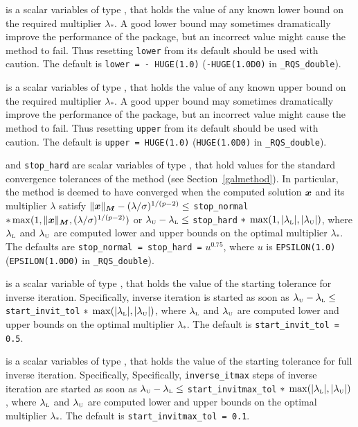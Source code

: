 \documentclass{galahad}
\newcommand{\packagename}{RQS}
\newcommand{\fullpackagename}{\libraryname\_\packagename}
\begin{document}
\begin{description}
 is a scalar variables of type \realdp, that holds the value
of any known lower bound on the required multiplier $\lambda_*$. A good lower
bound may sometimes dramatically improve the performance of the package, but
an incorrect value might cause the method to fail. Thus resetting
{\tt lower} from its default should be used with caution.
The default is {\tt lower = - HUGE(1.0)}
({\tt -HUGE(1.0D0)} in {\tt \fullpackagename\_double}).

 is a scalar variables of type \realdp, that holds the value
of any known upper bound on the required multiplier $\lambda_*$. A good upper
bound may sometimes dramatically improve the performance of the package, but
an incorrect value might cause the method to fail. Thus resetting
{\tt upper} from its default should be used with caution.
The default is {\tt upper = HUGE(1.0)}
({\tt HUGE(1.0D0)} in {\tt \fullpackagename\_double}).

 and {\tt stop\_hard} are scalar variables of type \realdp,
that hold values for the standard convergence tolerances of the method
(see Section~\ref{galmethod}).
In particular, the method is deemed to have converged when the
computed solution ${\bm{x}}$ and its multiplier $\lambda$ satisfy
$\|{\bm{x}}\|_{{\bm{M}}} -  (\lambda/\sigma)^{1/(p-2)} \leq$ {\tt stop\_normal}
$\ast \max(1,\|{\bm{x}}\|_{{\bm{M}}},(\lambda/\sigma)^{1/(p-2)})$ or
$\lambda_{\mbox{\protect\tiny U}} - \lambda_{\mbox{\protect\tiny L}}
\leq$ {\tt stop\_hard} $\ast \; \max( 1, | \lambda_{\mbox{\protect\tiny L}} |,
| \lambda_{\mbox{\protect\tiny U}} | )$, where
$\lambda_{\mbox{\protect\tiny L}}$ and
$\lambda_{\mbox{\protect\tiny U}}$ are computed lower and upper bounds
on the optimal multiplier $\lambda_*$.
The defaults are {\tt stop\_normal = stop\_hard =} $u^{0.75}$,
where $u$ is {\tt EPSILON(1.0)} ({\tt EPSILON(1.0D0)} in
{\tt \fullpackagename\_double}).

 is a scalar variable of type \realdp, that holds the
value of the starting tolerance for inverse iteration.
Specifically, inverse iteration is started as soon as
$\lambda_{\mbox{\protect\tiny U}} - \lambda_{\mbox{\protect\tiny L}}
\leq$ {\tt start\_invit\_tol} $\ast \;
 \max( | \lambda_{\mbox{\protect\tiny L}} |,
 | \lambda_{\mbox{\protect\tiny U}} | )$, where
$\lambda_{\mbox{\protect\tiny L}}$ and
$\lambda_{\mbox{\protect\tiny U}}$ are computed lower and upper bounds
on the optimal multiplier $\lambda_*$.
The default is {\tt start\_invit\_tol = 0.5}.

 is a scalar variables of type \realdp, that holds the
value of the starting tolerance for full inverse iteration. Specifically,
Specifically, {\tt inverse\_itmax} steps of inverse iteration are
started as soon as
$\lambda_{\mbox{\protect\tiny U}} - \lambda_{\mbox{\protect\tiny L}}
\leq$ {\tt start\_invitmax\_tol} $\ast \;
 \max( | \lambda_{\mbox{\protect\tiny L}} |,
 | \lambda_{\mbox{\protect\tiny U}} | )$, where
$\lambda_{\mbox{\protect\tiny L}}$ and
$\lambda_{\mbox{\protect\tiny U}}$ are computed lower and upper bounds
on the optimal multiplier $\lambda_*$.
The default is {\tt start\_invitmax\_tol = 0.1}.


\end{description}
\end{document}
